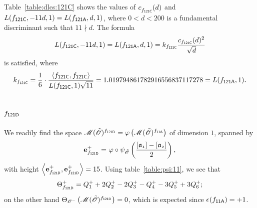 Table~\ref{table:dlcs:121C} shows
the values of $c^{}_{f_\mathsf{{121C}}}(d)$
and $L(f_\mathsf{{121C}},-11d,1) = L(f_\mathsf{{121A}},d,1)$,
where $0<d<200$ is a fundamental discriminant
such that
$11\nmid d$.
The formula
\[
  L(f_\mathsf{{121C}},-11d,1) = L(f_\mathsf{{121A}},d,1)
  = k_{f_\mathsf{{121C}}} \frac{c_{f_\mathsf{{121C}}}(d)^2}{\sqrt{d}}
\]
is satisfied, where 
\[
  k_{\mf{121C}} = \frac{1}{6}\cdot
  \frac{\<\mf{121C},\mf{121C}>}
        {L(\mf{121C},1)\sqrt{11}}
  = 1.019794861782916556837117278  = L(\mf{121A},1).
\]
\subsection{$f_\mathsf{{121D}}$}
We readily find the space $\operatorname{{\mathscr M}}({\tilde{{\mathscr{O}}}})^{f_\mathsf{{121D}}}
={\varphi}\left(\operatorname{{\mathscr M}}({\tilde{{\mathscr{O}}}})^{f_\mathsf{{11A}}}\right)$
of dimension $1$, spanned by
\begin{align*}
  \e{\mf{121D}}^+ = &\ \twist\circ\psi_{\Ot}\left(\frac{\cls{a_{1}}-\cls{a_{2}}}{2}\right),\\
\end{align*}
with height $\<\e{\mf{121D}}^+,\e{\mf{121D}}^+>=15$.
Using table~\ref{table:psi:11},
we see that
\begin{align*}
  {\Theta}^+_{f_\mathsf{{121D}}} & =  Q_{1}^{+} + 2Q_{2}^{+} - 2Q_{3}^{+} - Q_{4}^{+} - 3Q_{5}^{+} + 3Q_{6}^{+}; \\
\end{align*}
on the other hand
${\Theta}_{{{\mathscr{O}}^-}}\left(\operatorname{{\mathscr M}}({\tilde{{\mathscr{O}}}})^{f_\mathsf{{121D}}}\right)  = 0$,
which is expected since $\sign(\mf{11A})= +1$.
